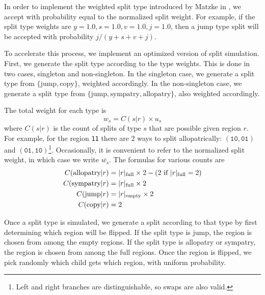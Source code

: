 \documentclass{article}
\begin{document}
In order to implement the weighted split type introduced by Matzke in
\cite{ModelSelectionMatzke2014}, we accept with probability equal to the
normalized split weight.
For example, if the split type weights are $y = 1.0, s = 1.0, v = 1.0, j=1.0$,
then a jump type split will be accepted with probability $j/(y + s + v +
j)$\footnotemark.

To accelerate this process, we implement an optimized version of split
simulation.
First, we generate the split type according to the type weights.
This is done in two cases, singleton and non-singleton.
In the singleton case, we generate a split type from $\{\text{jump},
\text{copy}\}$, weighted accordingly.
In the non-singleton case, we generate a split type from $\{\text{jump},
\text{sympatry}, \text{allopatry}\}$, also weighted accordingly.

The total weight for each type is
\begin{equation}
	w_s = C(s|r) \times u_s
\end{equation}
where $C(s|r)$ is the count of splits of type $s$ that are
possible given region $r$.
For example, for the region \texttt{11} there are 2 ways to split
allopatrically: $(\texttt{10}, \texttt{01})$ and $(\texttt{01},
\texttt{10})$\footnote{Left and right branches are distinguishable, so swaps
	are also valid.}\footnotemark.
Occasionally, it is convenient to refer to the normalized split weight, in
which case we write \( \overline{w_s} \).
The formulas for various counts are
\begin{align*}
  C(\text{allopatry}|r) & =
  |r|_\text{full} \times 2 - (2 \text{ if } |r|_\text{full} = 2) \\
  C(\text{sympatry}|r)  & = |r|_\text{full} \times 2           \\ C(\text{jump}|r) & =
  |r|_\text{empty} \times 2                                    \\ C(\text{copy}|r) & = 2 \\
\end{align*}


Once a split type is simulated, we generate
a split according to that type by first determining which region will be
flipped\footnotemark.
If the split type is jump, the region is chosen from among the empty regions.
If the split type is allopatry or sympatry, the region is chosen from among the
full regions.
Once the region is flipped, we pick randomly which child gets which region,
with uniform probability.
\end{document}
